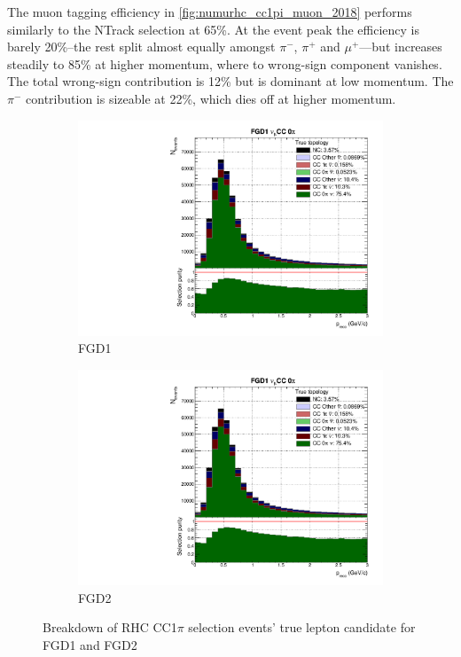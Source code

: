 The muon tagging efficiency in \autoref{fig:numurhc_cc1pi_muon_2018} performs similarly to the NTrack selection at 65\%. At the event peak the efficiency is barely 20\%--the rest split almost equally amongst $\pi^-$, $\pi^+$ and $\mu^+$---but increases steadily to 85\% at higher momentum, where to wrong-sign component vanishes. The total wrong-sign contribution is 12\% but is dominant at low momentum. The $\pi^-$ contribution is sizeable at 22\%, which dies off at higher momentum.
\begin{figure}[h]
	\begin{subfigure}[t]{0.49\textwidth}
		\includegraphics[width=\textwidth,page=28, trim={0mm 0mm 0mm 9mm}, clip]{figures/mach3/2018/Selection/2018_RedNDmatrix_rebin_verbose_may_noweights_diagnostics}
		\caption{FGD1}
	\end{subfigure}
	\begin{subfigure}[t]{0.49\textwidth}
		\includegraphics[width=\textwidth,page=34, trim={0mm 0mm 0mm 9mm}, clip]{figures/mach3/2018/Selection/2018_RedNDmatrix_rebin_verbose_may_noweights_diagnostics}
		\caption{FGD2}
	\end{subfigure}
	\caption{Breakdown of \numu RHC CC1$\pi$ selection events' true lepton candidate for FGD1 and FGD2}
	\label{fig:numurhc_cc1pi_muon_2018}
\end{figure}

